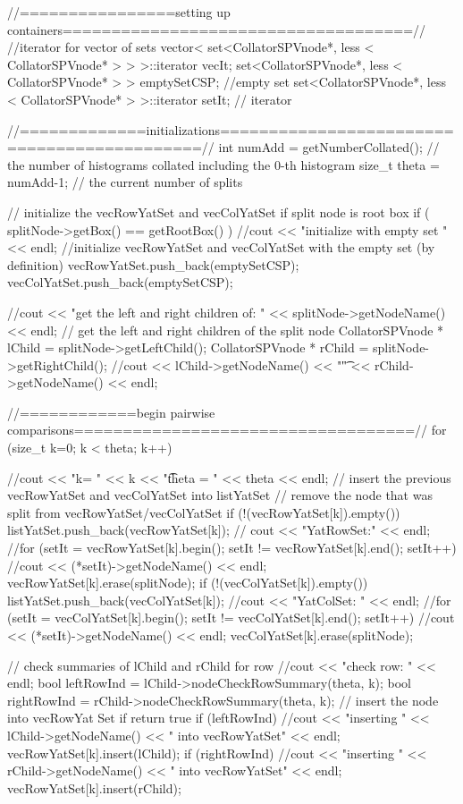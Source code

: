 \begin{DoxyCode}
{
  //================setting up containers====================================//
   //iterator for vector of sets
   vector< set<CollatorSPVnode*, less < CollatorSPVnode* > > >::iterator vecIt;
   set<CollatorSPVnode*, less < CollatorSPVnode* > > emptySetCSP; //empty set
   set<CollatorSPVnode*, less < CollatorSPVnode* > >::iterator setIt; //
      iterator
   
  //=============initializations============================================//
  int numAdd = getNumberCollated(); // the number of histograms collated
       including the 0-th histogram
  size_t theta = numAdd-1; // the current number of splits

  // initialize the vecRowYatSet and vecColYatSet if split node is root box
   if ( splitNode->getBox() == getRootBox() ) { 
    //cout << "initialize with empty set " << endl;
    //initialize vecRowYatSet and vecColYatSet with the empty set (by
       definition)
      vecRowYatSet.push_back(emptySetCSP);
      vecColYatSet.push_back(emptySetCSP); 
  }

  //cout << "get the left and right children of: " << splitNode->getNodeName()
       << endl;
   // get the left and right children of the split node
  CollatorSPVnode * lChild = splitNode->getLeftChild(); 
  CollatorSPVnode * rChild = splitNode->getRightChild();
  //cout << lChild->getNodeName() << "\t" << rChild->getNodeName() << endl;

  //============begin pairwise comparisons===================================//
  for (size_t k=0; k < theta; k++) {
    //cout << "k= " << k << "\t theta = " << theta << endl;
    // insert the previous vecRowYatSet and vecColYatSet into listYatSet
    // remove the node that was split from vecRowYatSet/vecColYatSet 
      if (!(vecRowYatSet[k]).empty()) {
      listYatSet.push_back(vecRowYatSet[k]);  
      // cout << "YatRowSet:" << endl;
      //for (setIt = vecRowYatSet[k].begin(); setIt != vecRowYatSet[k].end();
       setIt++) { 
      //cout << (*setIt)->getNodeName() << endl; }
      vecRowYatSet[k].erase(splitNode);
    }  
      if (!(vecColYatSet[k]).empty()) {
      listYatSet.push_back(vecColYatSet[k]);
      //cout << "YatColSet: " << endl;
      //for (setIt = vecColYatSet[k].begin(); setIt != vecColYatSet[k].end();
       setIt++) { 
      //cout << (*setIt)->getNodeName() << endl; }
      vecColYatSet[k].erase(splitNode);
    }

      // check summaries of lChild and rChild for row
    //cout << "check row: " << endl;
    bool leftRowInd = lChild->nodeCheckRowSummary(theta, k);
      bool rightRowInd = rChild->nodeCheckRowSummary(theta, k);
      // insert the node into vecRowYat Set if return true
      if (leftRowInd) { 
      //cout << "inserting " << lChild->getNodeName() << " into vecRowYatSet"
       << endl; 
      vecRowYatSet[k].insert(lChild);
    }
    if (rightRowInd) { 
      //cout << "inserting " << rChild->getNodeName() << " into vecRowYatSet"
       << endl; 
      vecRowYatSet[k].insert(rChild);
    }
    
}}
\end{DoxyCode}

